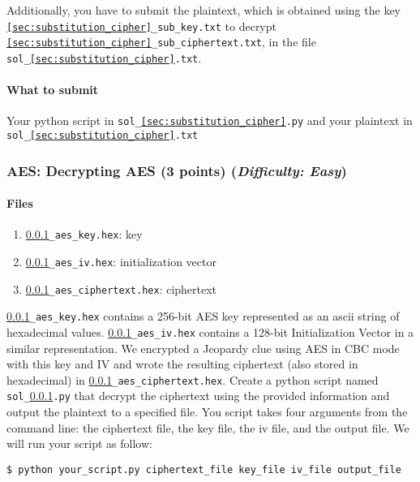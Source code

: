 \documentclass[letterpaper,12pt]{report}
\begin{document}
Additionally, you have to submit the plaintext, which is obtained using the key {\tt \ref{sec:substitution_cipher}\_sub\_key.txt} to decrypt {\tt \ref{sec:substitution_cipher}\_sub\_ciphertext.txt},  in the file {\tt sol\_\ref{sec:substitution_cipher}.txt}.

\smallskip
\noindent

\paragraph{What to submit}
Your python script in {\tt sol\_\ref{sec:substitution_cipher}.py} and your plaintext in {\tt sol\_\ref{sec:substitution_cipher}.txt}


\subsubsection{AES: Decrypting AES (3 points)  \hfill\rm\normalsize (\emph{Difficulty: Easy})}
\label{sec:decrypting_aes}
\paragraph{Files}

\begin{enumerate}
\item {\tt \ref{sec:decrypting_aes}\_aes\_key.hex}: key
\item {\tt \ref{sec:decrypting_aes}\_aes\_iv.hex}: initialization vector
\item {\tt \ref{sec:decrypting_aes}\_aes\_ciphertext.hex}: ciphertext
\end{enumerate}

{\tt \ref{sec:decrypting_aes}\_aes\_key.hex} contains a 256-bit AES key represented as an ascii string of hexadecimal values. {\tt \ref{sec:decrypting_aes}\_aes\_iv.hex} contains a 128-bit Initialization Vector in a similar representation. We encrypted a Jeopardy clue using AES in CBC mode with this key and IV and wrote the resulting ciphertext (also stored in hexadecimal) in {\tt \ref{sec:decrypting_aes}\_aes\_ciphertext.hex}.  Create a python script named {\tt sol\_\ref{sec:decrypting_aes}.py} that decrypt the ciphertext using the provided information and output the plaintext to a specified file.  You script takes four arguments from the command line: the ciphertext file, the key file, the iv file, and the output file. We will run your script as follow:
\begin{mdframed}
\begin{verbatim}
$ python your_script.py ciphertext_file key_file iv_file output_file
\end{verbatim}
\end{mdframed}
\end{document}
